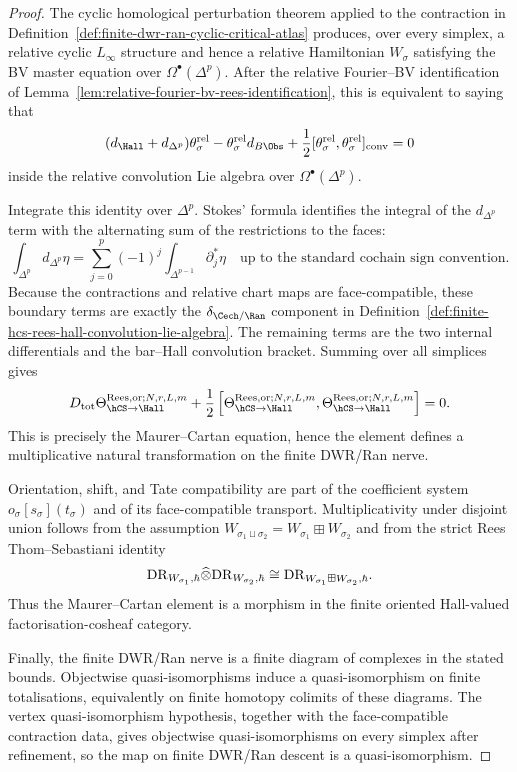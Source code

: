 \begin{proof}
The cyclic homological perturbation theorem applied to the contraction
in Definition~\ref{def:finite-dwr-ran-cyclic-critical-atlas} produces,
over every simplex, a relative cyclic $L_\infty$ structure and hence a
relative Hamiltonian $W_\sigma$ satisfying the BV master equation over
$\Omega^\bullet(\Delta^p)$. After the relative Fourier--BV
identification of
Lemma~\ref{lem:relative-fourier-bv-rees-identification}, this is
equivalent to saying that
\[
 (d_{\Hall}+d_{\Delta^p})\theta_\sigma^{\mathrm{rel}}
 -\theta_\sigma^{\mathrm{rel}}d_{B\Obs}
 +\frac{1}{2}
 [\theta_\sigma^{\mathrm{rel}},\theta_\sigma^{\mathrm{rel}}]_{\mathrm{conv}}
 =0
\]
inside the relative convolution Lie algebra over $\Omega^\bullet(\Delta^p)$.

Integrate this identity over $\Delta^p$. Stokes' formula identifies the
integral of the $d_{\Delta^p}$ term with the alternating sum of the
restrictions to the faces:
\[
 \int_{\Delta^p}d_{\Delta^p}\eta
 =
 \sum_{j=0}^{p}(-1)^j
 \int_{\Delta^{p-1}}\partial_j^*\eta
 \quad
 \text{up to the standard cochain sign convention.}
\]
Because the contractions and relative chart maps are face-compatible,
these boundary terms are exactly the
$\delta_{\Cech/\Ran}$ component in
Definition~\ref{def:finite-hcs-rees-hall-convolution-lie-algebra}.
The remaining terms are the two internal differentials and the
bar--Hall convolution bracket. Summing over all simplices gives
\[
 D_{\mathrm{tot}}
 \Theta_{\hCS\to\Hall}^{\mathrm{Rees},\mathrm{or};N,r,L,m}
 +\frac{1}{2}
 \left[
 \Theta_{\hCS\to\Hall}^{\mathrm{Rees},\mathrm{or};N,r,L,m},
 \Theta_{\hCS\to\Hall}^{\mathrm{Rees},\mathrm{or};N,r,L,m}
 \right]
 =0.
\]
This is precisely the Maurer--Cartan equation, hence the element
defines a multiplicative natural transformation on the finite DWR/Ran
nerve.

Orientation, shift, and Tate compatibility are part of the coefficient
system $o_\sigma[s_\sigma](t_\sigma)$ and of its face-compatible
transport. Multiplicativity under disjoint union follows from the
assumption
$W_{\sigma_1\sqcup\sigma_2}=W_{\sigma_1}\boxplus W_{\sigma_2}$ and from
the strict Rees Thom--Sebastiani identity
\[
 \mathrm{DR}_{W_{\sigma_1},\hbar}\widehat\otimes
 \mathrm{DR}_{W_{\sigma_2},\hbar}
 \cong
 \mathrm{DR}_{W_{\sigma_1}\boxplus W_{\sigma_2},\hbar}.
\]
Thus the Maurer--Cartan element is a morphism in the finite oriented
Hall-valued factorisation-cosheaf category.

Finally, the finite DWR/Ran nerve is a finite diagram of complexes in
the stated bounds. Objectwise quasi-isomorphisms induce a
quasi-isomorphism on finite totalisations, equivalently on finite
homotopy colimits of these diagrams. The vertex quasi-isomorphism
hypothesis, together with the face-compatible contraction data, gives
objectwise quasi-isomorphisms on every simplex after refinement, so the
map on finite DWR/Ran descent is a quasi-isomorphism.
\end{proof}

